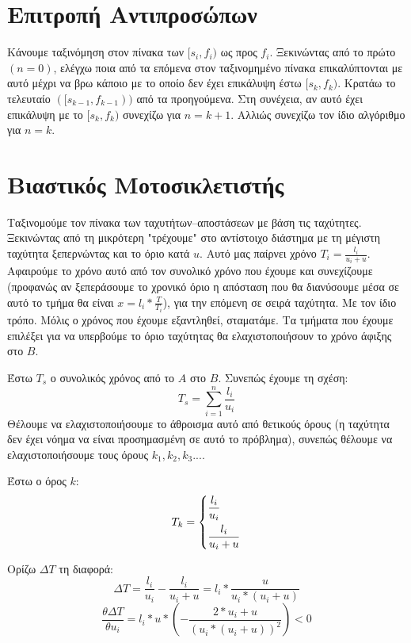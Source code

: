 \documentclass[a4paper,10pt]{article} \usepackage{anysize}
\begin{document}
\renewcommand{\labelenumi}{\roman{enumi})}
\renewcommand{\labelenumii}{(\arabic{enumii})}



\section{Επιτροπή Αντιπροσώπων} \setcounter{section}{1}
Κάνουμε ταξινόμηση στον πίνακα των $[s_i,f_i)$ ως προς $f_i$. Ξεκινώντας από
 το πρώτο $(n=0)$, ελέγχω ποια από τα επόμενα στον ταξινομημένο πίνακα επικαλύπτονται
με αυτό μέχρι να βρω κάποιο με το οποίο δεν έχει επικάλυψη έστω $[s_k,f_k)$. Κρατάω
το τελευταίο $([s_{k-1},f_{k-1}))$ από τα προηγούμενα. Στη συνέχεια, αν αυτό έχει
επικάλυψη με το $[s_k,f_k)$ συνεχίζω για $n=k+1$. Αλλιώς συνεχίζω
τον ίδιο αλγόριθμο για $n=k$.


\vspace{3cm}

\section{Βιαστικός Μοτοσικλετιστής}
Ταξινομούμε τον πίνακα των ταχυτήτων--αποστάσεων με βάση τις ταχύτητες.
Ξεκινώντας από τη μικρότερη "τρέχουμε" στο αντίστοιχο διάστημα με τη μέγιστη
ταχύτητα ξεπερνώντας και το όριο κατά $u$. Αυτό μας παίρνει χρόνο
$T_i=\frac{l_i}{u_i+u}$. Αφαιρούμε το χρόνο αυτό από τον συνολικό χρόνο που
έχουμε και συνεχίζουμε (προφανώς αν ξεπεράσουμε το χρονικό όριο η απόσταση που
θα διανύσουμε μέσα σε αυτό το τμήμα θα είναι $x=l_i*\frac{T}{T_i}$), για την
επόμενη σε σειρά ταχύτητα. Με τον ίδιο τρόπο. Μόλις ο χρόνος που έχουμε
εξαντληθεί, σταματάμε. Τα τμήματα που έχουμε επιλέξει για να υπερβούμε το όριο
ταχύτητας θα ελαχιστοποιήσουν το χρόνο άφιξης στο $B$.

Έστω $T_s$ ο συνολικός χρόνος από το $A$ στο $B$. Συνεπώς έχουμε τη σχέση:
\[
T_s=\sum_{i=1}^n{\frac{l_i}{u_i}}
\]
Θέλουμε να ελαχιστοποιήσουμε το άθροισμα αυτό από θετικούς όρους (η ταχύτητα
δεν έχει νόημα να είναι προσημασμένη σε αυτό το πρόβλημα), συνεπώς θέλουμε να
ελαχιστοποιήσουμε τους όρους $k_1, k_2, k_3 ...$.

Έστω ο όρος $k$:
\[
T_k=
	\begin{dcases}
	\frac{l_i}{u_i} \\
	\frac{l_i}{u_i+u}  
	\end{dcases}
\]

Ορίζω $\Delta{T}$ τη διαφορά:
\[
	\Delta{T}=\frac{l_i}{u_i} - \frac{l_i}{u_i+u} = l_i*\frac{u}{u_i*(u_i+u)}
\] 
\[
	\frac{\theta{\Delta{T}}}{\theta{u_i}} =
	l_i*u*(-\frac{2*u_i+u}{(u_i*(u_i+u))^2}) < 0
\]
\end{document}
